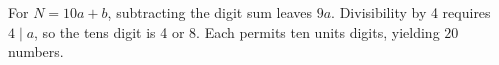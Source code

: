 For $N=10a+b$, subtracting the digit sum leaves $9a$. Divisibility by 4 requires $4\mid a$, so the tens digit is 4 or 8. Each permits ten units digits, yielding $\boxed{20}$ numbers.
